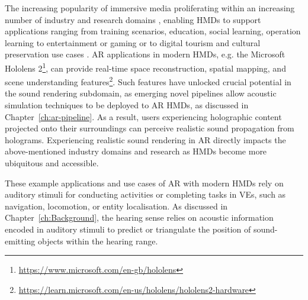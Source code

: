 The increasing popularity of immersive media proliferating within an increasing number of industry and research domains \citep{park2022metaverse}, enabling HMDs to support applications ranging from training scenarios, education, social learning, operation learning \citep{harris2020effect, ahir2020application} to entertainment or gaming \citep{yuen2011augmented, ke2018virtual} or to digital tourism and cultural preservation use cases \citep{schofield2018viking, selmanovic2020cultural}. AR applications in modern HMDs, e.g. the Microsoft Hololens 2\footnote{\url{https://www.microsoft.com/en-gb/hololens}\label{note:ms-hl2}}, can provide real-time space reconstruction, spatial mapping, and scene understanding features\footnote{\url{https://learn.microsoft.com/en-us/hololens/hololens2-hardware}\label{note:ms-hl2-hw}}. Such features have unlocked crucial potential in the sound rendering subdomain, as emerging novel pipelines allow acoustic simulation techniques to be deployed to AR HMDs, as discussed in Chapter~\ref{ch:ar-pipeline}. As a result, users experiencing holographic content projected onto their surroundings can perceive realistic sound propagation from holograms. Experiencing realistic sound rendering in AR directly impacts the above-mentioned industry domains and research as HMDs become more ubiquitous and accessible. \par
These example applications and use cases of AR with modern HMDs rely on auditory stimuli for conducting activities or completing tasks in VEs, such as navigation, locomotion, or entity localisation. As discussed in Chapter~\ref{ch:Background}, the hearing sense relies on acoustic information encoded in auditory stimuli to predict or triangulate the position of sound-emitting objects within the hearing range.


